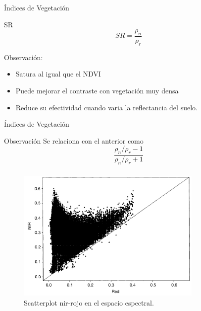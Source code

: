 \documentclass[handout]{beamer}
\begin{document}
\begin{frame}{\'Indices de Vegetaci\'on}
  \begin{block}{SR}
     $$SR=\frac{\rho_n}{\rho_r}$$
  \end{block}\pause
  \begin{block}{Observaci\'on:}
      \begin{itemize}[<+->]
        \item Satura al igual que el NDVI
        \item Puede mejorar el contraste con vegetaci\'on muy densa
        \item Reduce su efectividad cuando varia la reflectancia del suelo.
    \end{itemize}
  \end{block}
\end{frame}

\begin{frame}{\'Indices de Vegetaci\'on}
  \begin{block}{Observaci\'on}
    Se relaciona con el anterior como $$\frac{\rho_n/\rho_r-1}{\rho_n/\rho_r+1}$$
  \end{block}
\end{frame}

\begin{frame}
    \frametitle{\subsecname}
    \begin{figure}
    \begin{center}
        \includegraphics[width=0.8\textwidth]{imagenes/scatter82.png}
    \end{center}
        \caption{Scatterplot nir-rojo en el espacio espectral. }
    \end{figure}
\end{frame}
\end{document}
